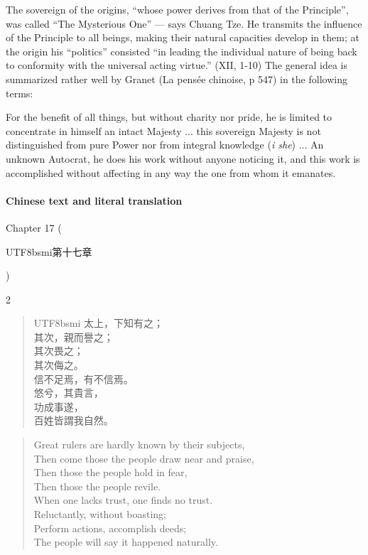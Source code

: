 The sovereign of the origins, ``whose power derives from that of the Principle'', was called ``The Mysterious One'' --- says Chuang Tze. He transmits the influence of the Principle to all beings, making their natural capacities develop in them; at the origin his ``politics'' consisted ``in leading the individual nature of being back to conformity with the universal acting virtue.'' (XII, 1-10) The general idea is summarized rather well by Granet (La pensée chinoise, p 547) in the following terms:

\begin{quotex}
For the benefit of all things, but without charity nor pride, he is limited to concentrate in himself an intact Majesty ... this sovereign Majesty is not distinguished from pure Power nor from integral knowledge (\emph{i she}) ... An unknown Autocrat, he does his work without anyone noticing it, and this work is accomplished without affecting in any way the one from whom it emanates.
\end{quotex}


\paragraph{Chinese text and literal translation}


Chapter 17 (\begin{CJK*}{UTF8}{bsmi}第十七章\end{CJK*})

\begin{paracol}{2}
\begin{verse}
\begin{CJK*}{UTF8}{bsmi}
太上，下知有之；\\
其次，親而譽之；\\
其次畏之；\\
其次侮之。\\
信不足焉，有不信焉。\\
悠兮，其貴言，\\
功成事遂，\\
百姓皆謂我自然。
\end{CJK*}
\end{verse}
\switchcolumn
\begin{verse}
Great rulers are hardly known by their subjects,\\
Then come those the people draw near and praise,\\
Then those the people hold in fear,\\
Then those the people revile.\\
When one lacks trust, one finds no trust.\\
Reluctantly, without boasting;\\
Perform actions, accomplish deeds;\\
The people will say it happened naturally.
\end{verse}
\end{paracol}


